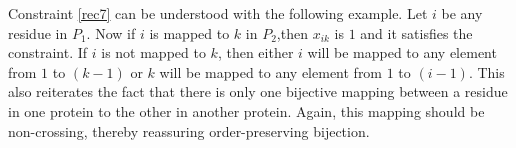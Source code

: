 Constraint \ref{rec7} can be understood with the following example. Let $i$ be any residue in $P_1$. Now if $i$ is mapped to $k$ in $P_2$,then $x_{ik}$ is $1$ and it satisfies the constraint. If $i$ is not mapped to $k$, then either $i$ will be mapped to any element from $1$ to $(k-1)$ or $k$ will be mapped to any element from $1$ to $(i-1)$. This also reiterates the fact that there is only one bijective mapping between a residue in one protein to the other in another protein. Again, this mapping should be non-crossing, thereby reassuring order-preserving bijection.
